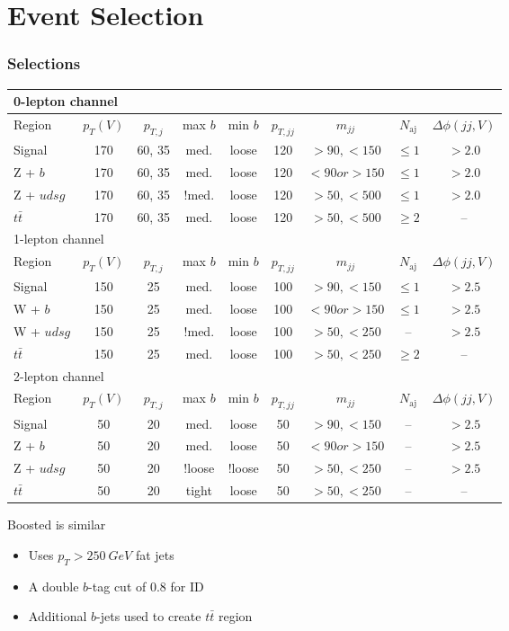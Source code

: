 \documentclass{beamer}
\begin{document}
\section{Event Selection}

\begin{frame}
  \frametitle{Selections}

  {\tiny
  \begin{tabular}{|l|c|c|c|c|c|c|c|c|}
    \hline
    \multicolumn{9}{|l|}{0-lepton channel} \\
    \hline
    Region & $p_T(V)$ & $p_{T,j}$ & max $b$ & min $b$ & $p_{T,jj}$ & $m_{jj}$ & $N_\textrm{aj}$ & $\Delta\phi(jj, V)$ \\
    \hline
    Signal & 170 & 60, 35 & med. & loose & 120 & $>90, <150$ & $\le 1$ & $> 2.0$ \\
    Z + $b$ & 170 & 60, 35 & med. & loose & 120 & $<90 or >150$ & $\le 1$ & $> 2.0$ \\
    Z + $udsg$ & 170 & 60, 35 & !med. & loose & 120 & $>50, <500$ & $\le 1$ & $> 2.0$ \\
    $t\bar{t}$ & 170 & 60, 35 & med. & loose & 120 & $>50, <500$ & $\ge 2$ & -- \\
    \hline
    \hline
    \multicolumn{9}{|l|}{1-lepton channel} \\
    \hline
    Region & $p_T(V)$ & $p_{T,j}$ & max $b$ & min $b$ & $p_{T,jj}$ & $m_{jj}$ & $N_\textrm{aj}$ & $\Delta\phi(jj, V)$ \\
    \hline
    Signal & 150 & 25 & med. & loose & 100 & $>90, <150$ & $\le 1$ & $> 2.5$ \\
    W + $b$ & 150 & 25 & med. & loose & 100 & $<90 or >150$ & $\le 1$ & $> 2.5$ \\
    W + $udsg$ & 150 & 25 & !med. & loose & 100 & $>50, <250$ & -- & $> 2.5$ \\
    $t\bar{t}$ & 150 & 25 & med. & loose & 100 & $>50, <250$ & $\ge 2$ & -- \\
    \hline
    \hline
    \multicolumn{9}{|l|}{2-lepton channel} \\
    \hline
    Region & $p_T(V)$ & $p_{T,j}$ & max $b$ & min $b$ & $p_{T,jj}$ & $m_{jj}$ & $N_\textrm{aj}$ & $\Delta\phi(jj, V)$ \\
    \hline
    Signal & 50 & 20 & med. & loose & 50 & $>90, <150$ & -- & $> 2.5$ \\
    Z + $b$ & 50 & 20 & med. & loose & 50 & $<90 or >150$ & -- & $> 2.5$ \\
    Z + $udsg$ & 50 & 20 & !loose & !loose & 50 & $>50, <250$ & -- & $> 2.5$ \\
    $t\bar{t}$ & 50 & 20 & tight & loose & 50 & $>50, <250$ & -- & -- \\
    \hline
  \end{tabular}
  }

  Boosted is similar
  \begin{itemize}
  \item Uses $p_T > \SI{250}{GeV}$ fat jets
  \item A double $b$-tag cut of 0.8 for ID
  \item Additional $b$-jets used to create $t\bar{t}$ region
  \end{itemize}

\end{frame}
\end{document}
